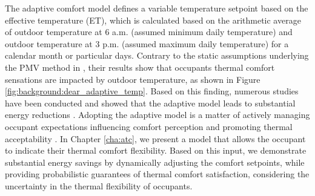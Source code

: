 The adaptive comfort model defines a variable temperature setpoint based on the effective temperature (ET), which is calculated based on the arithmetic average of outdoor temperature at 6 a.m. (assumed minimum daily temperature) and outdoor temperature at 3 p.m. (assumed maximum daily temperature) for a calendar month or particular days. Contrary to the static assumptions underlying the PMV method in \cite{fanger1970thermal}, their results show that occupants thermal comfort sensations are impacted by outdoor temperature, as shown in Figure \ref{fig:background:dear_adaptive_temp}. Based on this finding, numerous studies have been conducted and showed that the adaptive model leads to substantial energy reductions \citep{mui2003adaptive,egan2010the,ward2010automate,yang2013development,west2014trial,chew2015adaptive}. Adopting the adaptive model is a matter of actively managing occupant expectations influencing comfort perception and promoting thermal acceptability \citep{ward2010automate}. In Chapter \ref{cha:atc}, we present a model that allows the occupant to indicate their thermal comfort flexibility. Based on this input, we demonstrate substantial energy savings by dynamically adjusting the comfort setpoints, while providing probabilistic guarantees of thermal comfort satisfaction, considering the uncertainty in the thermal flexibility of occupants.


 


